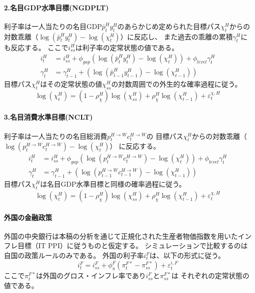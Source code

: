 \paragraph{2.名目GDP水準目標(NGDPLT)}\label{sec:model_policies_monetary_policy_ngdplt}
利子率は一人当たりの名目GDP\(\bar{p}_t^Hy_t^H\)のあらかじめ定められた目標パス\(\chi_t^H\)からの
対数乖離（\(\log(\bar{p}_t^Hy_t^H)-\log(\chi_t^H)\)）に反応し、
また過去の乖離の累積\(\gamma_t^H\)にも反応する。
ここで\(i_{ss}^H\)は利子率の定常状態の値である。
\begin{align}
\label{form:model_policies_mp_ngdplt_accumulation}
    i_t^H&=i_{ss}^H+\phi_{gap}(\log(\bar{p}_t^Hy_t^H)-\log(\chi_t^H))+\phi_{level}\gamma_t^H \\
    \gamma_t^H&=\gamma_{t-1}^H+(\log(\bar{p}_{t-1}^Hy_{t-1}^H)-\log(\chi_{t-1}^H))
\end{align}
目標パス\(\chi_t^H\)はその定常状態の値\(\chi_{ss}^H\)の対数周囲での外生的な確率過程に従う。
\begin{equation}
\label{form:model_policies_mp_ngdplt_target_path}
    \log(\chi_t^H)=(1-\rho_{\chi}^H)\log(\chi_{ss}^H)+\rho_{\chi}^H\log(\chi_{t-1}^H)+\varepsilon_t^{\chi,H}
\end{equation}

\paragraph{3.名目消費水準目標(NCLT)}
\label{sec:model_policies_monetary_policy_nclt}
利子率は一人当たりの名目総消費\(p_t^{H\to W}c_t^{H\to W}\)の
目標パス\(\chi_t^H\)からの対数乖離（\(\log(p_t^{H\to W}c_t^{H\to W})-\log(\chi_t^H)\)）
に反応する。
\begin{align}
    i_t^H&=i_{ss}^H+\phi_{gap}(\log(p_t^{H\to W}c_t^{H\to W})-\log(\chi_t^H))+\phi_{level}\gamma_t^H \label{form:model_policies_mp_nclt_interest_rate} \\
    \gamma_t^H&=\gamma_{t-1}^H+(\log(p_{t-1}^{H\to W}c_{t-1}^{H\to W})-\log(\chi_{t-1}^H)) \label{form:model_policies_mp_nclt_accumulation}
\end{align}
目標パス\(\chi_t^H\)は名目GDP水準目標と同様の確率過程に従う。
\begin{equation}
\label{form:model_policies_mp_nclt_target_path}
    \log(\chi_t^H)=(1-\rho_{\chi}^H)\log(\chi_{ss}^H)+\rho_{\chi}^H\log(\chi_{t-1}^H)+\varepsilon_t^{\chi,H}
\end{equation}

\paragraph{外国の金融政策}
\label{sec:model_policies_monetary_policy_foreign}
外国の中央銀行は本稿の分析を通じて正規化された生産者物価指数を用いたインフレ目標（IT PPI）に従うものと仮定する。
シミュレーションで比較するのは自国の政策ルールのみである。
外国の利子率\(i_t^F\)は、以下の形式に従う。
\begin{equation}
\label{form:model_policies_monetary_policy_it_foreign}
    i_t^F=i_{ss}^F+\phi_{\pi}^F(\pi_t^{F*}-\pi_{ss}^{F*})+\varepsilon_t^{i,F}
\end{equation}
ここで\(\pi_t^{F*}\)は外国のグロス・インフレ率であり\(i_{ss}^F\)と\(\pi_{ss}^{F*}\)は
それぞれの定常状態の値である。